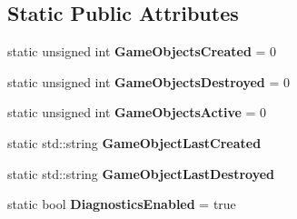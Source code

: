 \subsection*{Static Public Attributes}
\begin{DoxyCompactItemize}
\item 
\hypertarget{classDCEngine_1_1GameObject_a13b46ccfa313b8c5ce18617a1aa21731}{static unsigned int {\bfseries Game\-Objects\-Created} = 0}\label{classDCEngine_1_1GameObject_a13b46ccfa313b8c5ce18617a1aa21731}

\item 
\hypertarget{classDCEngine_1_1GameObject_a982dc1ac649f447dfa7fa3828f6864d2}{static unsigned int {\bfseries Game\-Objects\-Destroyed} = 0}\label{classDCEngine_1_1GameObject_a982dc1ac649f447dfa7fa3828f6864d2}

\item 
\hypertarget{classDCEngine_1_1GameObject_a1e481fa39d141fc5bed16485fb9ce21d}{static unsigned int {\bfseries Game\-Objects\-Active} = 0}\label{classDCEngine_1_1GameObject_a1e481fa39d141fc5bed16485fb9ce21d}

\item 
\hypertarget{classDCEngine_1_1GameObject_a0b53fcbb71e1dee22ff99fd177784f4a}{static std\-::string {\bfseries Game\-Object\-Last\-Created}}\label{classDCEngine_1_1GameObject_a0b53fcbb71e1dee22ff99fd177784f4a}

\item 
\hypertarget{classDCEngine_1_1GameObject_ac162481c14367cd07ebb104ec7136796}{static std\-::string {\bfseries Game\-Object\-Last\-Destroyed}}\label{classDCEngine_1_1GameObject_ac162481c14367cd07ebb104ec7136796}

\item 
\hypertarget{classDCEngine_1_1GameObject_a8901dd7e844e71bf9345ad0ed0489ba8}{static bool {\bfseries Diagnostics\-Enabled} = true}\label{classDCEngine_1_1GameObject_a8901dd7e844e71bf9345ad0ed0489ba8}

\end{DoxyCompactItemize}
